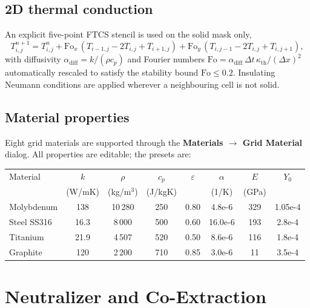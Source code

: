 \documentclass[11pt,a4paper]{article}
\begin{document}
\subsection{2D thermal conduction}

An explicit five-point FTCS stencil is used on the solid mask
only,
\begin{equation}
    T_{i,j}^{n+1} = T_{i,j}^{n}
    + \mathrm{Fo}_{x}\,(T_{i-1,j}-2T_{i,j}+T_{i+1,j})
    + \mathrm{Fo}_{y}\,(T_{i,j-1}-2T_{i,j}+T_{i,j+1}),
\end{equation}
with diffusivity
\(\alpha_{\mathrm{diff}}=k/(\rho c_{p})\) and Fourier numbers
\(\mathrm{Fo}=\alpha_{\mathrm{diff}}\,\Delta t\,\kappa_{\mathrm{th}}/(\Delta x)^{2}\)
automatically rescaled to satisfy the stability bound
\(\mathrm{Fo}\leq 0.2\).  Insulating Neumann conditions are applied
wherever a neighbouring cell is not solid.

\subsection{Material properties}

Eight grid materials are supported through the
\textbf{Materials $\rightarrow$ Grid Material} dialog.
All properties are editable; the presets are:

\begin{center}
\small
\begin{tabular}{lccccccc}
\toprule
Material & \(k\) & \(\rho\) & \(c_{p}\) & \(\varepsilon\) &
    \(\alpha\) & \(E\) & \(Y_{0}\)\\
         & (W/mK) & (kg/m\(^3\)) & (J/kgK) & & (1/K) & (GPa) & \\
\midrule
Molybdenum    & 138 & 10\,280 & 250 & 0.80 & 4.8e-6  & 329 & 1.05e-4\\
Steel SS316   & 16.3& 8\,000  & 500 & 0.60 & 16.0e-6 & 193 & 2.8e-4\\
Titanium      & 21.9& 4\,507  & 520 & 0.50 & 8.6e-6  & 116 & 1.8e-4\\
Graphite      & 120 & 2\,200  & 710 & 0.85 & 3.0e-6  & 11  & 3.5e-4\\
\bottomrule
\end{tabular}
\end{center}

\section{Neutralizer and Co-Extraction}
\end{document}

